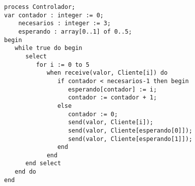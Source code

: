 \begin{ejercicio}
    \begin{verbatim}
        process Controlador;
        var contador : integer := 0;
            necesarios : integer := 3;
            esperando : array[0..1] of 0..5;
        begin
           while true do begin
              select
                 for i := 0 to 5
                    when receive(valor, Cliente[i]) do
                       if contador < necesarios-1 then begin
                          esperando[contador] := i;
                          contador := contador + 1;
                       else
                          contador := 0;
                          send(valor, Cliente[i]);
                          send(valor, Cliente[esperando[0]]);
                          send(valor, Cliente[esperando[1]]);
                       end
                    end
              end select
           end do
        end
    \end{verbatim}
\end{ejercicio}

